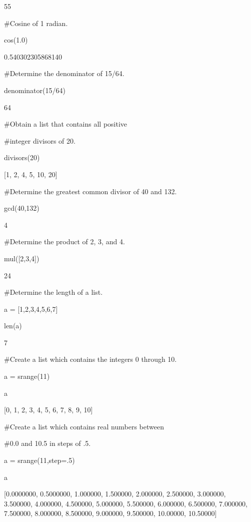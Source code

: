\documentclass[12pt,twoside]{book}
\begin{document}
55


\bigskip

\#Cosine of 1 radian.

cos(1.0)

{\textbar}

0.540302305868140

\#Determine the denominator of 15/64.

denominator(15/64)

{\textbar}

64


\bigskip

\#Obtain a list that contains all positive 

\#integer divisors of 20.

divisors(20)

{\textbar}

[1, 2, 4, 5, 10, 20]


\bigskip

\#Determine the greatest common divisor of 40 and 132.

gcd(40,132)

{\textbar}

4


\bigskip

\#Determine the product of 2, 3, and 4.

mul([2,3,4])

{\textbar}

24


\bigskip

\#Determine the length of a list.

a = [1,2,3,4,5,6,7]

len(a)

{\textbar}

7


\bigskip

\#Create a list which contains the integers 0 through 10.

a = srange(11)

a

{\textbar}

[0, 1, 2, 3, 4, 5, 6, 7, 8, 9, 10]

\#Create a list which contains real numbers between

\#0.0 and 10.5 in steps of .5.

a = srange(11,step=.5)

a

{\textbar}

[0.0000000, 0.5000000, 1.000000, 1.500000, 2.000000, 2.500000, 3.000000,
3.500000, 4.000000, 4.500000, 5.000000, 5.500000, 6.000000, 6.500000,
7.000000, 7.500000, 8.000000, 8.500000, 9.000000, 9.500000, 10.00000,
10.50000]
\end{document}
